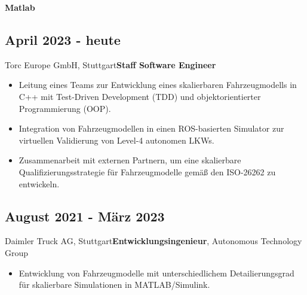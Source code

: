 \documentclass{mycv}
\begin{document}
\begin{paracol}{2}
        \begin{minipage}[c]{0.31\textwidth}
            \begin{flushright}
                {\bfseries Matlab}\\
                {\footnotesize
                    \href{https://de.mathworks.com/matlabcentral/profile/authors/4267772}{}}
            \end{flushright}
        \end{minipage}
        \begin{minipage}{0.05\textwidth}
            \matlabIcon
        \end{minipage}

\switchcolumn

{
    \subsection{April 2023 - heute}{Torc Europe GmbH, Stuttgart}{\bfseries Staff Software Engineer}
          \begin{itemize}

            \item Leitung eines Teams zur Entwicklung eines skalierbaren
                Fahrzeugmodells in C++ mit Test-Driven Development (TDD) und
                objektorientierter Programmierung (OOP).

            \item Integration von Fahrzeugmodellen in einen ROS-basierten
                Simulator zur virtuellen Validierung von Level-4 autonomen LKWs. 

            \item Zusammenarbeit mit externen Partnern, um eine skalierbare
                Qualifizierungsstrategie für Fahrzeugmodelle gem{\"a}{\ss} den
                ISO-26262 zu entwickeln.
          \end{itemize}
     
          \subsection{August 2021 - M{\"a}rz 2023}{Daimler Truck AG, Stuttgart}{{\bfseries Entwicklungsingenieur}, Autonomous Technology Group}
           \begin{itemize}
               \item Entwicklung von Fahrzeugmodelle mit unterschiedlichem
                   Detailierungsgrad f{\"u}r skalierbare Simulationen in MATLAB/Simulink.


\end{itemize}}
\end{paracol}
\end{document}
